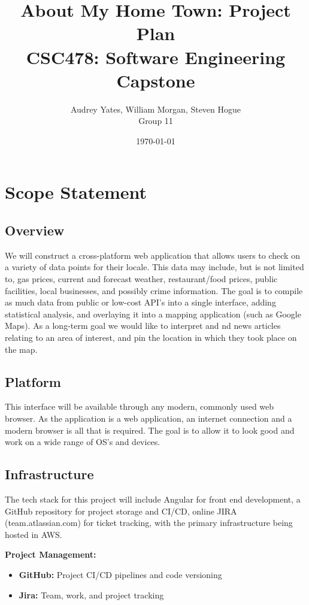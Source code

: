 \documentclass[12pt]{article}
\title{\bf About My Home Town: Project Plan \\ \large CSC478: Software Engineering Capstone}
\author{Audrey Yates, William Morgan, Steven Hogue \\ Group 11}
\date{\today}
\begin{document}
\maketitle

\tableofcontents

\newpage

\section{Scope Statement}\label{sec:scope}

\subsection{Overview}

We will construct a cross-platform web application that allows users to check on a variety of data points for their locale. This data may include, but is not limited to, gas prices, current and forecast weather, restaurant/food prices, public facilities, local businesses, and possibly crime information. The goal is to compile as much data from public or low-cost API's into a single interface, adding statistical analysis, and overlaying it into a mapping application (such as Google Maps). As a long-term goal we would like to interpret and nd news articles relating to an area of interest, and pin the location in which they took place on the map.

\subsection{Platform}

This interface will be available through any modern, commonly used web browser. As the application is a web application, an internet connection and a modern browser is all that is required. The goal is to allow it to look good and work on a wide range of OS's and devices.

\subsection{Infrastructure}

The tech stack for this project will include Angular for front end development, a GitHub repository for project storage and CI/CD, online JIRA (team.atlassian.com) for ticket tracking, with the primary infrastructure being hosted in AWS.

\textbf{Project Management:}

\begin{itemize}
    \item \textbf{GitHub:} Project CI/CD pipelines and code versioning
    \item \textbf{Jira:} Team, work, and project tracking
\end{itemize}
\end{document}

